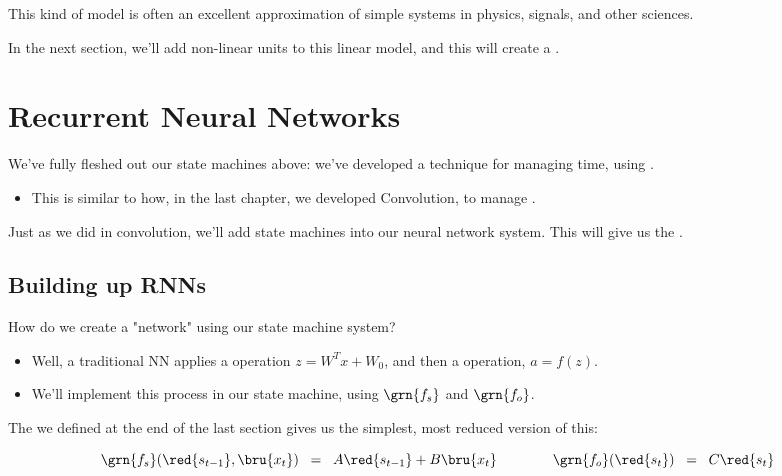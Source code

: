         

        This kind of model is often an excellent approximation of simple systems in physics, signals, and other sciences.

        \subsecdiv

        In the next section, we'll add non-linear units to this linear model, and this will create a .\\

\pagebreak

\section{Recurrent Neural Networks}

    We've fully fleshed out our state machines above: we've developed a technique for managing time, using .

    \begin{itemize}
        \item This is similar to how, in the last chapter, we developed Convolution, to manage .
    \end{itemize}

    Just as we did in convolution, we'll add state machines into our neural network system. This will give us the .

    \subsection{Building up RNNs}

        How do we create a "network" using our state machine system?

        \begin{itemize}
            \item  Well, a traditional NN applies a  operation $z=W^Tx+W_0$, and then a  operation, $a=f(z)$.
            
            \item We'll implement this process in our state machine, using $\grn{f_s}$ and $\grn{f_o}$.
        \end{itemize}

        The  we defined at the end of the last section gives us the simplest, most reduced version of this:

        \begin{equation*}
            \grn{f_s}(\red{s_{t-1}},\bru{x_t}) 
            \;\;=\;\; A\red{s_{t-1}} + B\bru{x_t}
            \qquad \qquad
            \grn{f_o}(\red{s_t}) 
            \;\;=\;\; C\red{s_t}
        \end{equation*}

